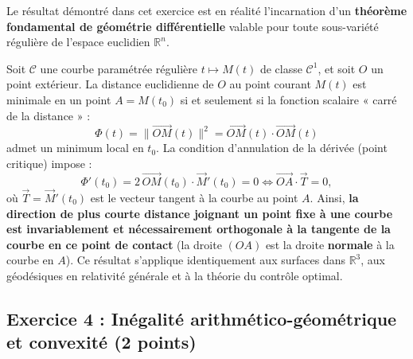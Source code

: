 \documentclass[11pt,a4paper]{article}
\newcommand{\R}{\mathbb{R}}
\begin{document}
\begin{remarquebox}
Le résultat démontré dans cet exercice est en réalité l'incarnation d'un \textbf{théorème fondamental de géométrie différentielle} valable pour toute sous-variété régulière de l'espace euclidien $\R^n$.

Soit $\mathcal{C}$ une courbe paramétrée régulière $t \mapsto M(t)$ de classe $\mathcal{C}^1$, et soit $O$ un point extérieur.
La distance euclidienne de $O$ au point courant $M(t)$ est minimale en un point $A = M(t_0)$ si et seulement si la fonction scalaire « carré de la distance » :
\[
\Phi(t) = \|\vec{OM}(t)\|^2 = \vec{OM}(t) \cdot \vec{OM}(t)
\]
admet un minimum local en $t_0$. La condition d'annulation de la dérivée (point critique) impose :
\[
\Phi'(t_0) = 2 \, \vec{OM}(t_0) \cdot \vec{M}'(t_0) = 0 \iff \vec{OA} \cdot \vec{T} = 0,
\]
où $\vec{T} = \vec{M}'(t_0)$ est le vecteur tangent à la courbe au point $A$.
Ainsi, \textbf{la direction de plus courte distance joignant un point fixe à une courbe est invariablement et nécessairement orthogonale à la tangente de la courbe en ce point de contact} (la droite $(OA)$ est la droite \textbf{normale} à la courbe en $A$). Ce résultat s'applique identiquement aux surfaces dans $\R^3$, aux géodésiques en relativité générale et à la théorie du contrôle optimal.
\end{remarquebox}

\vspace{0.4cm}

\subsection*{Exercice 4 : Inégalité arithmético-géométrique et convexité \hfill \normalfont\normalsize (2 points)}
\end{document}
